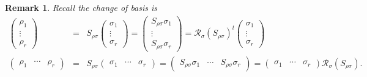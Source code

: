 \documentclass[aps,preprint]{revtex4}
\newtheorem{remark}[theorem]{Remark}
\begin{document}
\begin{remark}
Recall the change of basis is 
\begin{eqnarray}
\left( 
\begin{array}{c}
\rho _{1} \\ 
\vdots \\ 
\rho _{r}%
\end{array}%
\right) &=&S_{\rho \sigma }\left( 
\begin{array}{c}
\sigma _{1} \\ 
\vdots \\ 
\sigma _{r}%
\end{array}%
\right) =\left( 
\begin{array}{c}
S_{\rho \sigma }\sigma _{1} \\ 
\vdots \\ 
S_{\rho \sigma }\sigma _{r}%
\end{array}%
\right) =\mathcal{R}_{\sigma }\left( S_{\rho \sigma }\right) ^{t}\left( 
\begin{array}{c}
\sigma _{1} \\ 
\vdots \\ 
\sigma _{r}%
\end{array}%
\right) \\
\left( 
\begin{array}{ccc}
\rho _{1} & \cdots & \rho _{r}%
\end{array}%
\right) &=&S_{\rho \sigma }\left( 
\begin{array}{ccc}
\sigma _{1} & \cdots & \sigma _{r}%
\end{array}%
\right) =\left( 
\begin{array}{ccc}
S_{\rho \sigma }\sigma _{1} & \cdots & S_{\rho \sigma }\sigma _{r}%
\end{array}%
\right) =\left( 
\begin{array}{ccc}
\sigma _{1} & \cdots & \sigma _{r}%
\end{array}%
\right) \mathcal{R}_{\sigma }\left( S_{\rho \sigma }\right) .
\end{eqnarray}
\end{remark}
\end{document}
